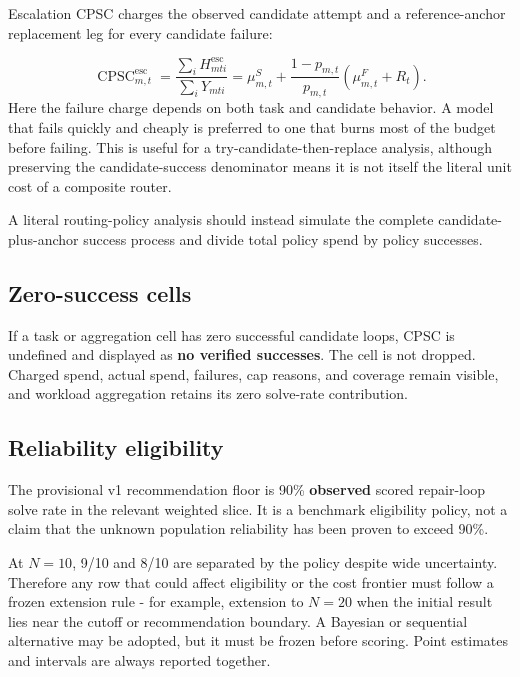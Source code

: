 \documentclass[11pt]{article}
\begin{document}
Escalation CPSC charges the observed candidate attempt and a reference-anchor replacement leg for every candidate failure:

\[
\operatorname{CPSC}^{\mathrm{esc}}_{m,t}
=\frac{\sum_i H^{\mathrm{esc}}_{mti}}{\sum_iY_{mti}}
=\mu^S_{m,t}+\frac{1-p_{m,t}}{p_{m,t}}(\mu^F_{m,t}+R_t).
\]
Here the failure charge depends on both task and candidate behavior. A model that fails quickly and cheaply is preferred to one that burns most of the budget before failing. This is useful for a try-candidate-then-replace analysis, although preserving the candidate-success denominator means it is not itself the literal unit cost of a composite router.

A literal routing-policy analysis should instead simulate the complete candidate-plus-anchor success process and divide total policy spend by policy successes.

\subsection{Zero-success cells}\hypertarget{85-zero-success-cells}{}\label{85-zero-success-cells}

If a task or aggregation cell has zero successful candidate loops, CPSC is undefined and displayed as \textbf{no verified successes}. The cell is not dropped. Charged spend, actual spend, failures, cap reasons, and coverage remain visible, and workload aggregation retains its zero solve-rate contribution.

\subsection{Reliability eligibility}\hypertarget{86-reliability-eligibility}{}\label{86-reliability-eligibility}

The provisional v1 recommendation floor is 90\% \textbf{observed} scored repair-loop solve rate in the relevant weighted slice. It is a benchmark eligibility policy, not a claim that the unknown population reliability has been proven to exceed 90\%.

At $N=10$, 9/10 and 8/10 are separated by the policy despite wide uncertainty. Therefore any row that could affect eligibility or the cost frontier must follow a frozen extension rule - for example, extension to $N=20$ when the initial result lies near the cutoff or recommendation boundary. A Bayesian or sequential alternative may be adopted, but it must be frozen before scoring. Point estimates and intervals are always reported together.
\end{document}
